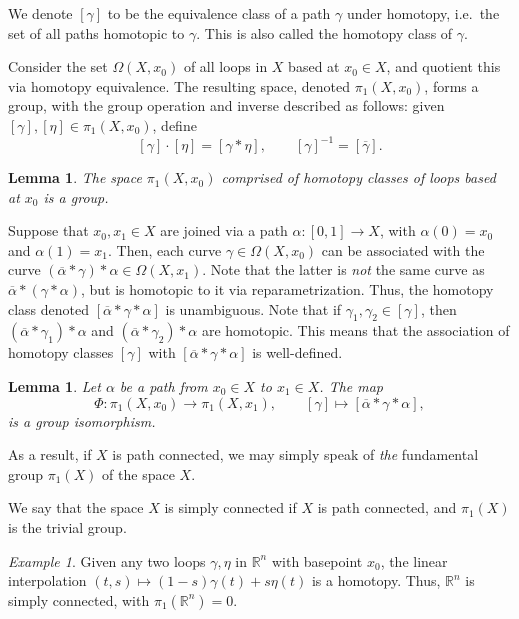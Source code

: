 \documentclass[12pt]{article}
\newcommand{\R}{\mathbb{R}}
\newtheorem{lemma}[theorem]{Lemma}
\theoremstyle{definition}
\theoremstyle{remark}
\newtheorem*{example}{Example}
\begin{document}
    We denote $[\gamma]$ to be the equivalence class of a path $\gamma$ under
    homotopy, i.e.\ the set of all paths homotopic to $\gamma$. This is also called
    the homotopy class of $\gamma$.

    Consider the set $\Omega(X, x_0)$ of all loops in $X$ based at $x_0 \in X$, and
    quotient this via homotopy equivalence. The resulting space, denoted $\pi_1(X,
    x_0)$, forms a group, with the group operation and inverse described as follows:
    given $[\gamma], [\eta] \in \pi_1(X, x_0)$, define \[
        [\gamma] \cdot [\eta] = [\gamma * \eta], \qquad
        [\gamma]^{-1} = [\overline{\gamma}].
    \]

    \begin{lemma}
        The space $\pi_1(X, x_0)$ comprised of homotopy classes of loops based at
        $x_0$ is a group.
    \end{lemma}

    Suppose that $x_0, x_1 \in X$ are joined via a path $\alpha\colon [0, 1] \to X$,
    with $\alpha(0) = x_0$ and $\alpha(1) = x_1$. Then, each curve $\gamma \in
    \Omega(X, x_0)$ can be associated with the curve $(\overline{\alpha} * \gamma) *
    \alpha \in \Omega(X, x_1)$. Note that the latter is \emph{not} the same curve as
    $\overline{\alpha} * (\gamma * \alpha)$, but is homotopic to it via
    reparametrization. Thus, the homotopy class denoted $[\overline{\alpha} * \gamma
    * \alpha]$ is unambiguous. Note that if $\gamma_1, \gamma_2 \in [\gamma]$, then
    $(\overline{\alpha} * \gamma_1) * \alpha$ and $(\overline{\alpha} * \gamma_2) *
    \alpha$ are homotopic. This means that the association of homotopy classes
    $[\gamma]$ with $[\overline{\alpha} * \gamma * \alpha]$ is well-defined. \\

    \begin{lemma}
        Let $\alpha$ be a path from $x_0 \in X$ to $x_1 \in X$. The map \[
            \Phi\colon \pi_1(X, x_0) \to \pi_1(X, x_1), \qquad
            [\gamma] \mapsto [\overline{\alpha} * \gamma * \alpha],
        \] is a group isomorphism.
    \end{lemma}

    As a result, if $X$ is path connected, we may simply speak of \emph{the}
    fundamental group $\pi_1(X)$ of the space $X$.

    We say that the space $X$ is simply connected if $X$ is path connected, and
    $\pi_1(X)$ is the trivial group.

    \begin{example}
        Given any two loops $\gamma, \eta$ in $\R^n$ with basepoint $x_0$, the linear
        interpolation $(t, s) \mapsto (1 - s)\gamma(t) + s\eta(t)$ is a homotopy.
        Thus, $\R^n$ is simply connected, with $\pi_1(\R^n) = 0$.
    \end{example}
\end{document}
